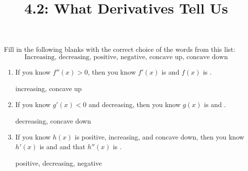 \documentclass[nooutcomes]{ximera}
\title{4.2: What Derivatives Tell Us}
\begin{document}
\begin{abstract}		\end{abstract}
\maketitle

\begin{problem}
Fill in the following blanks with the correct choice of the words from this list:
$$ \text{Increasing, decreasing, positive, negative, concave up, concave down} $$

	\begin{enumerate}
	
	\item  If you know $f''(x) > 0$, then you know $f'(x)$ is \underline{\hspace{3cm}} and $f(x)$ is \underline{\hspace{3cm}}.
		\begin{freeResponse}
		increasing, concave up
		\end{freeResponse}
		
			
				
	\item  If you know $g'(x) < 0$ and decreasing, then you know $g(x)$ is \underline{\hspace{3cm}} and \underline{\hspace{3cm}}.
		\begin{freeResponse}
		decreasing, concave down
		\end{freeResponse}
		
			
				
	\item  If you know $h(x)$ is positive, increasing, and concave down, then you know $h'(x)$ is \underline{\hspace{3cm}} and \underline{\hspace{3cm}} and that $h''(x)$ is \underline{\hspace{3cm}}.
		\begin{freeResponse}
		positive, decreasing, negative
		\end{freeResponse}
		
			
				
	\end{enumerate}	
		
\end{problem}
\end{document}
